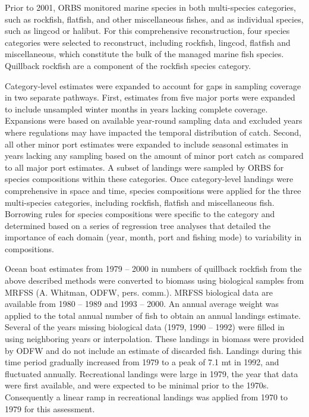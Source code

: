 \documentclass[11pt,
  english,
  a4paper,
]{article}
\begin{document}
\leavevmode\tagmcend\tagstructend\par


Prior to 2001, ORBS monitored marine species in both multi-species categories, such as rockfish, flatfish, and other miscellaneous fishes, and as individual species, such as lingcod or halibut. For this comprehensive reconstruction, four species categories were selected to reconstruct, including rockfish, lingcod, flatfish and miscellaneous, which constitute the bulk of the managed marine fish species. Quillback rockfish are a component of the rockfish species category.

\leavevmode\tagmcend\tagstructend\par


Category-level estimates were expanded to account for gaps in sampling coverage in two separate pathways. First, estimates from five major ports were expanded to include unsampled winter months in years lacking complete coverage. Expansions were based on available year-round sampling data and excluded years where regulations may have impacted the temporal distribution of catch. Second, all other minor port estimates were expanded to include seasonal estimates in years lacking any sampling based on the amount of minor port catch as compared to all major port estimates. A subset of landings were sampled by ORBS for species compositions within these categories. Once category-level landings were comprehensive in space and time, species compositions were applied for the three multi-species categories, including rockfish, flatfish and miscellaneous fish. Borrowing rules for species compositions were specific to the category and determined based on a series of regression tree analyses that detailed the importance of each domain (year, month, port and fishing mode) to variability in compositions.

\leavevmode\tagmcend\tagstructend\par


Ocean boat estimates from 1979 -- 2000 in numbers of quillback rockfish from the above described methods were converted to biomass using biological samples from MRFSS (A. Whitman, ODFW, pers. comm.). MRFSS biological data are available from 1980 -- 1989 and 1993 -- 2000. An annual average weight was applied to the total annual number of fish to obtain an annual landings estimate. Several of the years missing biological data (1979, 1990 -- 1992) were filled in using neighboring years or interpolation. These landings in biomass were provided by ODFW and do not include an estimate of discarded fish. Landings during this time period gradually increased from 1979 to a peak of 7.1 mt in 1992, and fluctuated annually. Recreational landings were large in 1979, the year that data were first available, and were expected to be minimal prior to the 1970s. Consequently a linear ramp in recreational landings was applied from 1970 to 1979 for this assessment.
\end{document}
